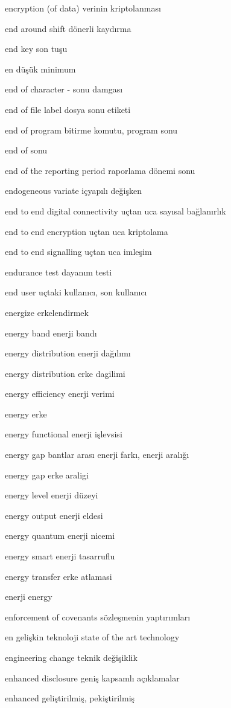 \documentclass[12pt,fleqn]{article}\usepackage{../../common}
\begin{document}
encryption (of data) verinin kriptolanması

end around shift dönerli kaydırma

end key son tuşu

en düşük minimum

end of character - sonu damgası

end of file label dosya sonu etiketi

end of program bitirme komutu, program sonu

end of sonu

end of the reporting period raporlama dönemi sonu

endogeneous variate içyapılı değişken

end to end digital connectivity uçtan uca sayısal bağlanırlık

end to end encryption uçtan uca kriptolama

end to end signalling uçtan uca imleşim

endurance test dayanım testi

end user uçtaki kullanıcı, son kullanıcı

energize erkelendirmek

energy band enerji bandı

energy distribution enerji dağılımı

energy distribution erke dagilimi

energy efficiency enerji verimi

energy erke

energy functional enerji işlevsisi

energy gap bantlar arası enerji farkı, enerji aralığı

energy gap erke araligi

energy level enerji düzeyi

energy output enerji eldesi

energy quantum enerji nicemi

energy smart enerji tasarruflu

energy transfer erke atlamasi

enerji energy

enforcement of covenants sözleşmenin yaptırımları

en gelişkin teknoloji state of the art technology

engineering change teknik değişiklik

enhanced disclosure geniş kapsamlı açıklamalar

enhanced geliştirilmiş, pekiştirilmiş
\end{document}
